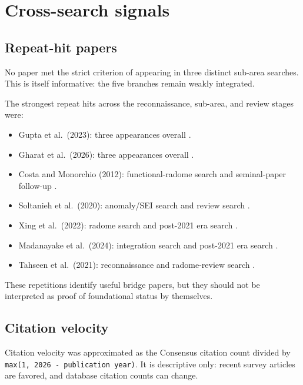 \documentclass[
  10pt,
]{article}
\providecommand{\tightlist}{%
  \setlength{\itemsep}{0pt}\setlength{\parskip}{0pt}}
\begin{document}
\section{Cross-search signals}\label{cross-search-signals}

\subsection{Repeat-hit papers}\label{repeat-hit-papers}

No paper met the strict criterion of appearing in three distinct
sub-area searches. This is itself informative: the five branches remain
weakly integrated.

The strongest repeat hits across the reconnaissance, sub-area, and
review stages were:

\begin{itemize}
\tightlist
\item
  Gupta et al.~(2023): three appearances overall \citep{gupta2023}.
\item
  Gharat et al.~(2026): three appearances overall \citep{gharat2026}.
\item
  Costa and Monorchio (2012): functional-radome search and seminal-paper
  follow-up \citep{costa2012}.
\item
  Soltanieh et al.~(2020): anomaly/SEI search and review search
  \citep{soltanieh2020}.
\item
  Xing et al.~(2022): radome search and post-2021 era search
  \citep{xing2022}.
\item
  Madanayake et al.~(2024): integration search and post-2021 era search
  \citep{madanayake2024}.
\item
  Tahseen et al.~(2021): reconnaissance and radome-review search
  \citep{tahseen2021}.
\end{itemize}

These repetitions identify useful bridge papers, but they should not be
interpreted as proof of foundational status by themselves.

\subsection{Citation velocity}\label{citation-velocity}

Citation velocity was approximated as the Consensus citation count
divided by \texttt{max(1,\ 2026\ -\ publication\ year)}. It is
descriptive only: recent survey articles are favored, and database
citation counts can change.
\end{document}

